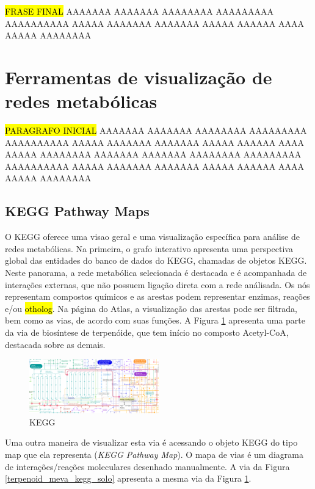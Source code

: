 \documentclass[conference]{IEEEtran}
\begin{document}
\hl{FRASE FINAL} \indent AAAAAAA AAAAAAA  AAAAAAAA AAAAAAAAA AAAAAAAAAA AAAAA AAAAAAA AAAAAAA AAAAA AAAAAA AAAA AAAAA AAAAAAAA \\

\section{Ferramentas de visualização de redes metabólicas}

\hl{PARAGRAFO INICIAL} AAAAAAA AAAAAAA  AAAAAAAA AAAAAAAAA AAAAAAAAAA AAAAA AAAAAAA AAAAAAA AAAAA AAAAAA AAAA AAAAA AAAAAAAA AAAAAAA AAAAAAA  AAAAAAAA AAAAAAAAA AAAAAAAAAA AAAAA AAAAAAA AAAAAAA AAAAA AAAAAA AAAA AAAAA AAAAAAAA 

\subsection{KEGG Pathway Maps}

O KEGG oferece uma visao geral e uma visualização específica para análise de redes metabólicas. Na primeira, o grafo interativo apresenta uma perspectiva global das entidades do banco de dados do KEGG, chamadas de objetos KEGG. Neste panorama, a rede metabólica selecionada é destacada e é acompanhada de interações externas, que não possuem ligação direta com a rede análisada. Os nós representam compostos químicos e as arestas podem representar enzimas, reações e/ou \hl{otholog}. Na página do Atlas, a visualização das arestas pode ser filtrada, bem como as vias, de acordo com suas funções. A Figura \ref{terpenoid_meva_kegg} apresenta uma parte da via de biosíntese de terpenóide, que tem início no composto Acetyl-CoA, destacada sobre as demais.

\begin{figure}[!t]
\centering
\includegraphics[width=0.5\textwidth]{terpenoid_meva_kegg.png}
\caption{KEGG}
\label{terpenoid_meva_kegg}
\end{figure}

Uma outra maneira de visualizar esta via é acessando o objeto KEGG do tipo map que ela representa (\textit{KEGG Pathway Map}). O mapa de vias é um diagrama de interações/reações moleculares desenhado manualmente. A via da Figura \ref{terpenoid_meva_kegg_solo} apresenta a mesma via da Figura \ref{terpenoid_meva_kegg}.
\end{document}
